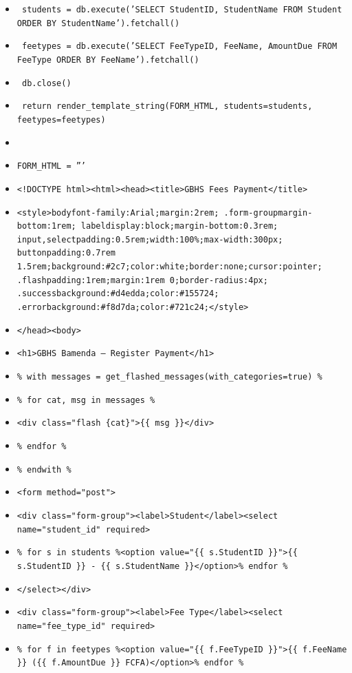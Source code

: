 \documentclass[11pt]{article}
\begin{document}
\begin{methode}
\begin{itemize}
    \item \texttt{    students = db.execute('SELECT StudentID, StudentName FROM Student ORDER BY StudentName').fetchall()}
    \item \texttt{    feetypes = db.execute('SELECT FeeTypeID, FeeName, AmountDue FROM FeeType ORDER BY FeeName').fetchall()}
    \item \texttt{    db.close()}
    \item \texttt{    return render\_template\_string(FORM\_HTML, students=students, feetypes=feetypes)}
    \item \texttt{}
    \item \texttt{FORM\_HTML = '''}
    \item \texttt{<!DOCTYPE html><html><head><title>GBHS Fees Payment</title>}
    \item \texttt{<style>body{font-family:Arial;margin:2rem;} .form-group{margin-bottom:1rem;} label{display:block;margin-bottom:0.3rem;} input,select{padding:0.5rem;width:100\%;max-width:300px;} button{padding:0.7rem 1.5rem;background:\#2c7;color:white;border:none;cursor:pointer;} .flash{padding:1rem;margin:1rem 0;border-radius:4px;} .success{background:\#d4edda;color:\#155724;} .error{background:\#f8d7da;color:\#721c24;}</style>}
    \item \texttt{</head><body>}
    \item \texttt{<h1>GBHS Bamenda --- Register Payment</h1>}
    \item \texttt{\% with messages = get\_flashed\_messages(with\_categories=true) \%}
    \item \texttt{\%   for cat, msg in messages \%}
    \item \texttt{<div class="flash \{cat\}">\{\{ msg \}\}</div>}
    \item \texttt{\%   endfor \%}
    \item \texttt{\% endwith \%}
    \item \texttt{<form method="post">}
    \item \texttt{<div class="form-group"><label>Student</label><select name="student\_id" required>}
    \item \texttt{\% for s in students \%<option value="\{\{ s.StudentID \}\}">\{\{ s.StudentID \}\} - \{\{ s.StudentName \}\}</option>\% endfor \%}
    \item \texttt{</select></div>}
    \item \texttt{<div class="form-group"><label>Fee Type</label><select name="fee\_type\_id" required>}
    \item \texttt{\% for f in feetypes \%<option value="\{\{ f.FeeTypeID \}\}">\{\{ f.FeeName \}\} (\{\{ f.AmountDue \}\} FCFA)</option>\% endfor \%}

\end{itemize}
\end{methode}
\end{document}

